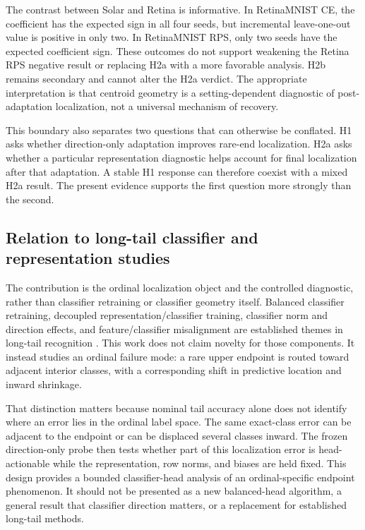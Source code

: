 The contrast between Solar and Retina is informative. In RetinaMNIST CE, the
coefficient has the expected sign in all four seeds, but incremental
leave-one-out value is positive in only two. In RetinaMNIST RPS, only two seeds
have the expected coefficient sign. These outcomes do not support weakening the
Retina RPS negative result or replacing H2a with a more favorable analysis.
H2b remains secondary and cannot alter the H2a verdict. The appropriate
interpretation is that centroid geometry is a setting-dependent diagnostic of
post-adaptation localization, not a universal mechanism of recovery.

This boundary also separates two questions that can otherwise be conflated.
H1 asks whether direction-only adaptation improves rare-end localization. H2a
asks whether a particular representation diagnostic helps account for final
localization after that adaptation. A stable H1 response can therefore coexist
with a mixed H2a result. The present evidence supports the first question more
strongly than the second.

\subsection{Relation to long-tail classifier and representation studies}

The contribution is the ordinal localization object and the controlled
diagnostic, rather than classifier retraining or classifier geometry itself.
Balanced classifier retraining, decoupled representation/classifier training,
classifier norm and direction effects, and feature/classifier misalignment are
established themes in long-tail recognition
\cite{kang2020decoupling,alshammari2022weight,c2am2022angular,wang2026alignment}. This work does not
claim novelty for those components. It instead studies an ordinal failure mode:
a rare upper endpoint is routed toward adjacent interior classes, with a
corresponding shift in predictive location and inward shrinkage.

That distinction matters because nominal tail accuracy alone does not identify
where an error lies in the ordinal label space. The same exact-class error can
be adjacent to the endpoint or can be displaced several classes inward. The
frozen direction-only probe then tests whether part of this localization error
is head-actionable while the representation, row norms, and biases are held
fixed. This design provides a bounded classifier-head analysis of an
ordinal-specific endpoint phenomenon. It should not be presented as a new
balanced-head algorithm, a general result that classifier direction matters, or
a replacement for established long-tail methods.

